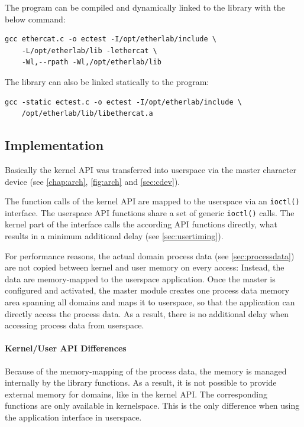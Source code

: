 \documentclass[a4paper,12pt,BCOR6mm,bibtotoc,idxtotoc]{scrbook}
\begin{document}
The program can be compiled and dynamically linked to the library with the
below command:

\begin{lstlisting}[caption=Linker command for using the userspace library,
label=lst:linker-user]
gcc ethercat.c -o ectest -I/opt/etherlab/include \
    -L/opt/etherlab/lib -lethercat \
    -Wl,--rpath -Wl,/opt/etherlab/lib
\end{lstlisting}

The library can also be linked statically to the program:

\begin{lstlisting}
gcc -static ectest.c -o ectest -I/opt/etherlab/include \
    /opt/etherlab/lib/libethercat.a
\end{lstlisting}

\subsection{Implementation}
\label{sec:userimp}

Basically the kernel API was transferred into userspace via the master
character device (see \autoref{chap:arch}, \autoref{fig:arch} and
\autoref{sec:cdev}).

The function calls of the kernel API are mapped to the userspace via an
\lstinline+ioctl()+ interface. The userspace API functions share a set of
generic \lstinline+ioctl()+ calls. The kernel part of the interface calls the
according API functions directly, what results in a minimum additional delay
(see \autoref{sec:usertiming}).

For performance reasons, the actual domain process data (see
\autoref{sec:processdata}) are not copied between kernel and user memory on
every access: Instead, the data are memory-mapped to the userspace
application. Once the master is configured and activated, the master module
creates one process data memory area spanning all domains and maps it to
userspace, so that the application can directly access the process data. As a
result, there is no additional delay when accessing process data from
userspace.

\paragraph{Kernel/User API Differences} Because of the memory-mapping of the
process data, the memory is managed internally by the library functions. As a
result, it is not possible to provide external memory for domains, like in the
kernel API. The corresponding functions are only available in kernelspace.
This is the only difference when using the application interface in userspace.
\end{document}
